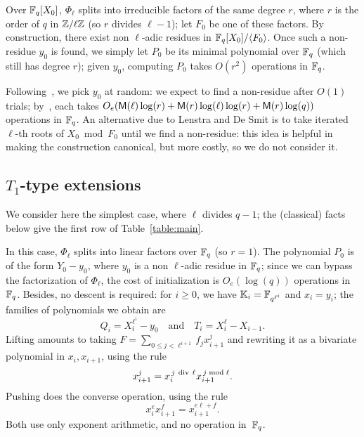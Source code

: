\documentclass{sig-alternate}
\newcommand{\Cyc}{\Phi}  %
\begin{document}
Over $\mathbb{F}_q[X_0]$, $\Cyc_\ell$ splits into irreducible factors of the
same degree $r$, where $r$ is the order of $q$ in $\mathbb{Z}/\ell\mathbb{Z}$ (so $r$
divides $\ell-1$); let $F_0$ be one of these factors. By construction,
there exist non $\ell$-adic residues in $\mathbb{F}_q[X_0]/\langle F_0
\rangle$. Once such a non-residue $y_0$ is found, we simply let $P_0$
be its minimal polynomial over $\mathbb{F}_q$ (which still has degree $r$);
given $y_0$, computing $P_0$ takes $O(r^2)$ operations in $\mathbb{F}_q$.

Following~\cite{Shoup90,shoup94,couveignes+lercier11}, we pick $y_0$
at random: we expect to find a non-residue after $O(1)$ trials;
by~\cite[Lemma~15]{shoup94}, each takes
$O_e(\mathsf{M}(\ell)\log(r)+\mathsf{M}(r)\log(\ell)\log(r)+\mathsf{M}(r)\log(q))$
operations in $\mathbb{F}_q$. An alternative due to Lenstra and De Smit is to
take iterated $\ell$-th roots of $X_0 \bmod F_0$ until we find a
non-residue: this idea is helpful in making the construction
canonical, but more costly, so we do not consider it.


\subsection{$T_1$-type extensions}\label{ssec:T1}

We consider here the simplest case, where $\ell$ divides $q-1$; the
(classical) facts below give the first row of Table~\ref{table:main}.

In this case, $\Phi_\ell$ splits into linear factors over $\mathbb{F}_q$ (so
$r=1$). The polynomial $P_0$ is of the form $Y_0-y_0$, where $y_0$ is
a non $\ell$-adic residue in $\mathbb{F}_q$; since we can bypass the
factorization of $\Phi_\ell$, the cost of initialization is
$O_e(\log(q))$ operations in $\mathbb{F}_q$. Besides, no descent is required:
for $i \ge 0$, we have $\mathbb{K}_i=\mathbb{F}_{q^{\ell^i}}$ and $x_i=y_i$; the
families of polynomials we obtain are
\begin{equation}
  \label{eq:T1}
  Q_i=X_i^{\ell^i}-y_0 \quad\text{and}\quad T_i=X_{i}^\ell-X_{i-1}.
\end{equation}
Lifting amounts to taking $F = \sum_{0 \le j < \ell^{i+1}} f_j
x_{i+1}^j$ and rewriting it as a bivariate polynomial in
$x_i,x_{i+1}$, using the rule
$$x_{i+1}^j = x_i^{\,j {\rm~div~} \ell} x_{i+1}^{\,j \bmod \ell}.$$
Pushing does the converse operation, using the rule
$$x_i^e x_{i+1}^f = x_{i+1}^{e \ell + f}.$$ Both 
use only exponent arithmetic, and no operation in~$\mathbb{F}_q$. 
\end{document}
